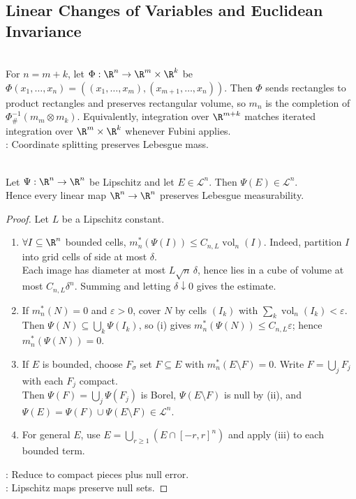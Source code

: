 \subsection{Linear Changes of Variables and Euclidean Invariance}

\begin{perspective} \label{per:coordinate-splitting-completed-product-measure} \\
For $n=m+k$, let $\Phi:\R^n\to\R^m\times\R^k$ be $\Phi(x_1,\ldots,x_n)=((x_1,\ldots,x_m),(x_{m+1},\ldots,x_n))$. Then $\Phi$ sends rectangles to product rectangles and preserves rectangular volume, so $m_n$ is the completion of $\Phi^{-1}_{\#}(m_m\otimes m_k)$. Equivalently, integration over $\R^{m+k}$ matches iterated integration over $\R^m\times\R^k$ whenever Fubini applies.\\
: Coordinate splitting preserves Lebesgue mass.
\end{perspective}

\begin{proposition} \label{prop:lipschitz-images-lebesgue-measurable} \\
Let $\Psi:\R^n\to\R^n$ be Lipschitz and let $E\in\mathcal L^n$. Then $\Psi(E)\in\mathcal L^n$.\\
Hence every linear map $\R^n\to\R^n$ preserves Lebesgue measurability.
\begin{proof}
Let $L$ be a Lipschitz constant.
\begin{enumerate}[label=(\roman*)]
\setlength{\itemsep}{0pt}
\item $\forall I\subseteq\R^n$ bounded cells, $m_n^\ast(\Psi(I))\leq C_{n,L}\operatorname{vol}_n(I)$. Indeed, partition $I$ into grid cells of side at most $\delta$.\\
Each image has diameter at most $L\sqrt n\,\delta$, hence lies in a cube of volume at most $C_{n,L}\delta^n$. Summing and letting $\delta\downarrow0$ gives the estimate.
\item If $m_n^\ast(N)=0$ and $\varepsilon>0$, cover $N$ by cells $(I_k)$ with $\sum\limits_k\operatorname{vol}_n(I_k)<\varepsilon$.\\
Then $\Psi(N)\subseteq\bigcup\limits_k\Psi(I_k)$, so (i) gives $m_n^\ast(\Psi(N))\leq C_{n,L}\varepsilon$; hence $m_n^\ast(\Psi(N))=0$.
\item If $E$ is bounded, choose $F_\sigma$ set $F\subseteq E$ with $m_n^\ast(E\setminus F)=0$. Write $F=\bigcup\limits_jF_j$ with each $F_j$ compact.\\
Then $\Psi(F)=\bigcup\limits_j\Psi(F_j)$ is Borel, $\Psi(E\setminus F)$ is null by (ii), and $\Psi(E)=\Psi(F)\cup\Psi(E\setminus F)\in\mathcal L^n$.
\item For general $E$, use $E=\bigcup\limits_{r\geq1}(E\cap[-r,r]^n)$ and apply (iii) to each bounded term.
\end{enumerate}
: Reduce to compact pieces plus null error.\\
: Lipschitz maps preserve null sets.
\end{proof}
\end{proposition}

